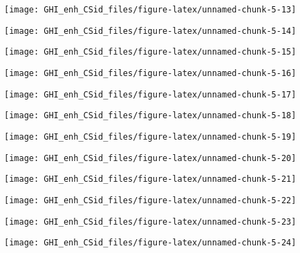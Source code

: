\documentclass[
  10pt,
  a4paper,oneside]{article}
\begin{document}
\begin{center}\texttt{[image: GHI\_enh\_CSid\_files/figure-latex/unnamed-chunk-5-13]} \end{center}

\begin{center}\texttt{[image: GHI\_enh\_CSid\_files/figure-latex/unnamed-chunk-5-14]} \end{center}

\begin{center}\texttt{[image: GHI\_enh\_CSid\_files/figure-latex/unnamed-chunk-5-15]} \end{center}

\begin{center}\texttt{[image: GHI\_enh\_CSid\_files/figure-latex/unnamed-chunk-5-16]} \end{center}

\begin{center}\texttt{[image: GHI\_enh\_CSid\_files/figure-latex/unnamed-chunk-5-17]} \end{center}

\begin{center}\texttt{[image: GHI\_enh\_CSid\_files/figure-latex/unnamed-chunk-5-18]} \end{center}

\begin{center}\texttt{[image: GHI\_enh\_CSid\_files/figure-latex/unnamed-chunk-5-19]} \end{center}

\begin{center}\texttt{[image: GHI\_enh\_CSid\_files/figure-latex/unnamed-chunk-5-20]} \end{center}

\begin{center}\texttt{[image: GHI\_enh\_CSid\_files/figure-latex/unnamed-chunk-5-21]} \end{center}

\begin{center}\texttt{[image: GHI\_enh\_CSid\_files/figure-latex/unnamed-chunk-5-22]} \end{center}

\begin{center}\texttt{[image: GHI\_enh\_CSid\_files/figure-latex/unnamed-chunk-5-23]} \end{center}

\begin{center}\texttt{[image: GHI\_enh\_CSid\_files/figure-latex/unnamed-chunk-5-24]} \end{center}
\end{document}
